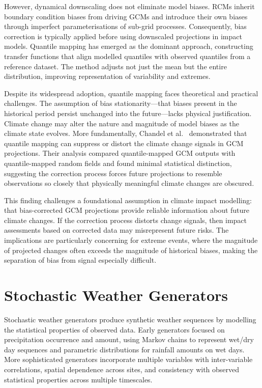 However, dynamical downscaling does not eliminate model biases. RCMs inherit boundary condition 
biases from driving GCMs and introduce their own biases through imperfect parameterisations of 
sub-grid processes. Consequently, bias correction is typically applied before using downscaled 
projections in impact models. Quantile mapping has emerged as the dominant approach, 
constructing transfer functions that align modelled quantiles with observed quantiles from a 
reference dataset. The method adjusts not just the mean but the entire distribution, improving 
representation of variability and extremes.

Despite its widespread adoption, quantile mapping faces theoretical and practical challenges. 
The assumption of bias stationarity---that biases present in the historical period persist 
unchanged into the future---lacks physical justification. Climate change may alter the nature 
and magnitude of model biases as the climate state evolves. More fundamentally, Chandel et 
al.~\cite{Chandel_2024} demonstrated that quantile mapping can suppress or distort the climate 
change signals in GCM projections. Their analysis compared quantile-mapped GCM outputs with 
quantile-mapped random fields and found minimal statistical distinction, suggesting the 
correction process forces future projections to resemble observations so closely that 
physically meaningful climate changes are obscured.

This finding challenges a foundational assumption in climate impact modelling: that 
bias-corrected GCM projections provide reliable information about future climate changes. If 
the correction process distorts change signals, then impact assessments based on corrected data 
may misrepresent future risks. The implications are particularly concerning for extreme events, 
where the magnitude of projected changes often exceeds the magnitude of historical biases, 
making the separation of bias from signal especially difficult.

\section{Stochastic Weather Generators}

Stochastic weather generators produce synthetic weather sequences by modelling the statistical 
properties of observed data. Early generators focused on precipitation occurrence and amount, 
using Markov chains to represent wet/dry day sequences and parametric distributions for 
rainfall amounts on wet days. More sophisticated generators incorporate multiple variables with 
inter-variable correlations, spatial dependence across sites, and consistency with observed 
statistical properties across multiple timescales.


